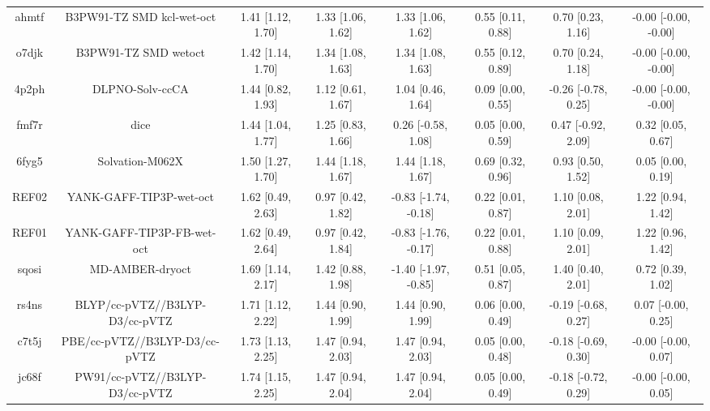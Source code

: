 \documentclass{article}
\begin{document}
\begin{center}
\begin{longtable}{|cccccccc|}
 ahmtf &                          B3PW91-TZ SMD kcl-wet-oct &  1.41 [1.12, 1.70] &  1.33 [1.06, 1.62] &     1.33 [1.06, 1.62] &  0.55 [0.11, 0.88] &    0.70 [0.23, 1.16] &  -0.00 [-0.00, -0.00] \\
 o7djk &                               B3PW91-TZ SMD wetoct &  1.42 [1.14, 1.70] &  1.34 [1.08, 1.63] &     1.34 [1.08, 1.63] &  0.55 [0.12, 0.89] &    0.70 [0.24, 1.18] &  -0.00 [-0.00, -0.00] \\
 4p2ph &                                    DLPNO-Solv-ccCA &  1.44 [0.82, 1.93] &  1.12 [0.61, 1.67] &     1.04 [0.46, 1.64] &  0.09 [0.00, 0.55] &  -0.26 [-0.78, 0.25] &  -0.00 [-0.00, -0.00] \\
 fmf7r &                                               dice &  1.44 [1.04, 1.77] &  1.25 [0.83, 1.66] &    0.26 [-0.58, 1.08] &  0.05 [0.00, 0.59] &   0.47 [-0.92, 2.09] &     0.32 [0.05, 0.67] \\
 6fyg5 &                                    Solvation-M062X &  1.50 [1.27, 1.70] &  1.44 [1.18, 1.67] &     1.44 [1.18, 1.67] &  0.69 [0.32, 0.96] &    0.93 [0.50, 1.52] &     0.05 [0.00, 0.19] \\
 REF02 &                            YANK-GAFF-TIP3P-wet-oct &  1.62 [0.49, 2.63] &  0.97 [0.42, 1.82] &  -0.83 [-1.74, -0.18] &  0.22 [0.01, 0.87] &    1.10 [0.08, 2.01] &     1.22 [0.94, 1.42] \\
 REF01 &                         YANK-GAFF-TIP3P-FB-wet-oct &  1.62 [0.49, 2.64] &  0.97 [0.42, 1.84] &  -0.83 [-1.76, -0.17] &  0.22 [0.01, 0.88] &    1.10 [0.09, 2.01] &     1.22 [0.96, 1.42] \\
 sqosi &                                    MD-AMBER-dryoct &  1.69 [1.14, 2.17] &  1.42 [0.88, 1.98] &  -1.40 [-1.97, -0.85] &  0.51 [0.05, 0.87] &    1.40 [0.40, 2.01] &     0.72 [0.39, 1.02] \\
 rs4ns &                     BLYP/cc-pVTZ//B3LYP-D3/cc-pVTZ &  1.71 [1.12, 2.22] &  1.44 [0.90, 1.99] &     1.44 [0.90, 1.99] &  0.06 [0.00, 0.49] &  -0.19 [-0.68, 0.27] &    0.07 [-0.00, 0.25] \\
 c7t5j &                      PBE/cc-pVTZ//B3LYP-D3/cc-pVTZ &  1.73 [1.13, 2.25] &  1.47 [0.94, 2.03] &     1.47 [0.94, 2.03] &  0.05 [0.00, 0.48] &  -0.18 [-0.69, 0.30] &   -0.00 [-0.00, 0.07] \\
 jc68f &                     PW91/cc-pVTZ//B3LYP-D3/cc-pVTZ &  1.74 [1.15, 2.25] &  1.47 [0.94, 2.04] &     1.47 [0.94, 2.04] &  0.05 [0.00, 0.49] &  -0.18 [-0.72, 0.29] &   -0.00 [-0.00, 0.05] \\

\end{longtable}
\end{center}
\end{document}
